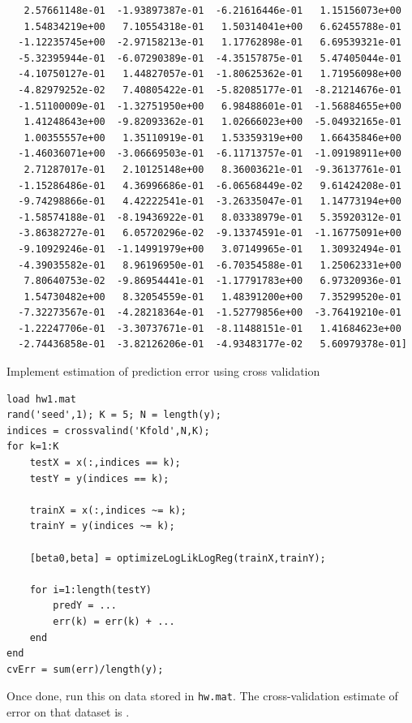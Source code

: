 \documentclass{article}
\begin{document}
\begin{lstlisting}
   2.57661148e-01  -1.93897387e-01  -6.21616446e-01   1.15156073e+00
   1.54834219e+00   7.10554318e-01   1.50314041e+00   6.62455788e-01
  -1.12235745e+00  -2.97158213e-01   1.17762898e-01   6.69539321e-01
  -5.32395944e-01  -6.07290389e-01  -4.35157875e-01   5.47405044e-01
  -4.10750127e-01   1.44827057e-01  -1.80625362e-01   1.71956098e+00
  -4.82979252e-02   7.40805422e-01  -5.82085177e-01  -8.21214676e-01
  -1.51100009e-01  -1.32751950e+00   6.98488601e-01  -1.56884655e+00
   1.41248643e+00  -9.82093362e-01   1.02666023e+00  -5.04932165e-01
   1.00355557e+00   1.35110919e-01   1.53359319e+00   1.66435846e+00
  -1.46036071e+00  -3.06669503e-01  -6.11713757e-01  -1.09198911e+00
   2.71287017e-01   2.10125148e+00   8.36003621e-01  -9.36137761e-01
  -1.15286486e-01   4.36996686e-01  -6.06568449e-02   9.61424208e-01
  -9.74298866e-01   4.42222541e-01  -3.26335047e-01   1.14773194e+00
  -1.58574188e-01  -8.19436922e-01   8.03338979e-01   5.35920312e-01
  -3.86382727e-01   6.05720296e-02  -9.13374591e-01  -1.16775091e+00
  -9.10929246e-01  -1.14991979e+00   3.07149965e-01   1.30932494e-01
  -4.39035582e-01   8.96196950e-01  -6.70354588e-01   1.25062331e+00
   7.80640753e-02  -9.86954441e-01  -1.17791783e+00   6.97320936e-01
   1.54730482e+00   8.32054559e-01   1.48391200e+00   7.35299520e-01
  -7.32273567e-01  -4.28218364e-01  -1.52779856e+00  -3.76419210e-01
  -1.22247706e-01  -3.30737671e-01  -8.11488151e-01   1.41684623e+00
  -2.74436858e-01  -3.82126206e-01  -4.93483177e-02   5.60979378e-01]
\end{lstlisting}
\newproblem{1pt}
Implement estimation of prediction error using cross validation
\begin{lstlisting}
load hw1.mat
rand('seed',1); K = 5; N = length(y);
indices = crossvalind('Kfold',N,K);
for k=1:K
    testX = x(:,indices == k);
    testY = y(indices == k);

    trainX = x(:,indices ~= k);
    trainY = y(indices ~= k);

    [beta0,beta] = optimizeLogLikLogReg(trainX,trainY);

    for i=1:length(testY)
        predY = ...
        err(k) = err(k) + ...
    end
end
cvErr = sum(err)/length(y);
\end{lstlisting}
Once done, run this on data stored in \texttt{hw\theHW.mat}. The cross-validation estimate of error on that dataset is \answer.
\end{document}
